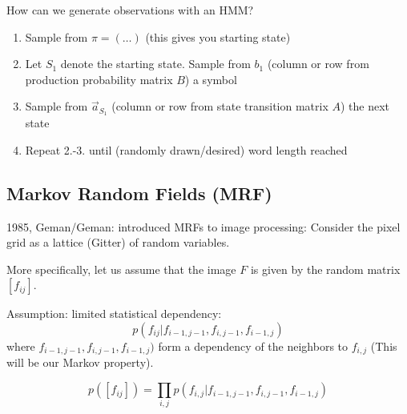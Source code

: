 \documentclass{scrartcl}
\begin{document}
\medbreak
How can we generate observations with an HMM?
\begin{enumerate}
    \item
        Sample from \(\pi = (\dots)\) (this gives you starting state) 
    \item
        Let \(S_1\) denote the starting state. Sample from \(b_1\) (column or row from production probability matrix \(B\)) a symbol
    \item
        Sample from \(\vec{a}_{S_1}\) (column or row from state transition matrix \(A\)) the next state
    \item
        Repeat 2.-3. until (randomly drawn/desired) word length reached
\end{enumerate}

\subsection{Markov Random Fields (MRF)}
1985, Geman/Geman: introduced MRFs to image processing:  Consider the pixel grid as a lattice (Gitter) of random variables.

More specifically, let us assume that the image \(F\) is given by the random matrix \([f_{ij}]\). %

Assumption: limited statistical dependency:
\[p(f_{ij}| f_{i-1, j-1}, f_{i, j-1}, f_{i-1,j})\]
where \(f_{i-1, j-1}, f_{i, j-1}, f_{i-1,j})\) form a dependency of the neighbors to \(f_{i,j}\) (This will be our Markov property).

\[p([f_{ij}]) = \prod_{i,j} p(f_{i,j} | f_{i-1, j-1}, f_{i, j-1}, f_{i-1,j})\]
\end{document}
